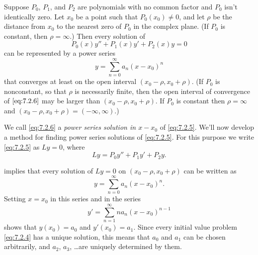 \begin{theorem}\label{thmtype:7.2.1}
Suppose $P_0$, $P_1$, and $P_2$ are polynomials with no common
factor and $P_0$ isn't  identically zero. Let $x_0$ be a point such
that $P_0(x_0)\ne0$, and let $\rho$ be the distance from $x_0$ to the
nearest zero of $P_0$ in the complex plane. (If $P_0$ is constant,
then $\rho=\infty$.) Then every solution of
\begin{equation}\label{eq:7.2.5}
P_0(x)y''+P_1(x)y'+P_2(x)y=0
\end{equation}
can be represented by a power series
 \begin{equation}\label{eq:7.2.6}
y=\sum_{n=0}^\infty a_n(x-x_0)^n
\end{equation}
that converges at least on the open interval $(x_0-\rho,x_0+\rho)$.
(If $P_0$ is nonconstant, so that $\rho$ is necessarily finite,
then the open interval of convergence of $\eqref{eq:7.2.6}$ may be larger
than $(x_0-\rho,x_0+\rho)$. If $P_0$ is constant then $\rho=\infty$
and $(x_0-\rho,x_0+\rho)=(-\infty,\infty)$.)
\end{theorem}

We call \eqref{eq:7.2.6} a \emph{\color{blue}power series solution in $x-x_0$}  of
\eqref{eq:7.2.5}. We'll now develop a method for finding power series
solutions of \eqref{eq:7.2.5}. For this purpose we write \eqref{eq:7.2.5} as
$Ly=0$, where
\begin{equation}\label{eq:7.2.7}
Ly=P_0y''+P_1y'+P_2y.
\end{equation}

 implies that every solution of $Ly=0$ on
$(x_0-\rho,x_0+\rho)$ can be written as
\[
y=\sum_{n=0}^\infty a_n(x-x_0)^n.
\]
Setting $x=x_0$ in this series and in the series
\[
y'=\sum_{n=1}^\infty na_n(x-x_0)^{n-1}
\]
shows that $y(x_0)=a_0$ and $y'(x_0)=a_1$. Since every initial value
problem \eqref{eq:7.2.4} has a unique solution, this means that $a_0$ and
$a_1$ can be chosen arbitrarily, and  $a_2$, $a_3$, \dots are
uniquely determined by them.

